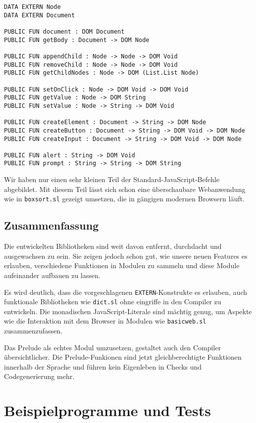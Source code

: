 \documentclass[runningheads]{llncs}
\begin{document}
\begin{verbatim}
DATA EXTERN Node
DATA EXTERN Document

PUBLIC FUN document : DOM Document
PUBLIC FUN getBody : Document -> DOM Node

PUBLIC FUN appendChild : Node -> Node -> DOM Void
PUBLIC FUN removeChild : Node -> Node -> DOM Void
PUBLIC FUN getChildNodes : Node -> DOM (List.List Node)

PUBLIC FUN setOnClick : Node -> DOM Void -> DOM Void
PUBLIC FUN getValue : Node -> DOM String
PUBLIC FUN setValue : Node -> String -> DOM Void

PUBLIC FUN createElement : Document -> String -> DOM Node
PUBLIC FUN createButton : Document -> String -> DOM Void -> DOM Node
PUBLIC FUN createInput : Document -> String -> DOM Void -> DOM Node

PUBLIC FUN alert : String -> DOM Void
PUBLIC FUN prompt : String -> String -> DOM String 
\end{verbatim}

Wir haben nur einen sehr kleinen Teil der Standard-JavaScript-Befehle
abgebildet. Mit diesem Teil lässt sich schon eine überschaubare Webanwendung
wie in \verb|boxsort.sl| gezeigt umsetzen, die in gängigen modernen Browsern
läuft.

\subsection{Zusammenfassung}

Die entwickelten Bibliotheken sind weit davon entfernt, durchdacht und
ausgewachsen zu sein. Sie zeigen jedoch schon gut, wie unsere neuen Features
es erlauben, verschiedene Funktionen in Modulen zu sammeln und diese Module
aufeinander aufbauen zu lassen.

Es wird deutlich, dass die vorgeschlagenen \verb|EXTERN|-Konstrukte es
erlauben, auch funktionale Bibliotheken wie \verb|dict.sl| ohne eingriffe
in den Compiler zu entwickeln. Die monadischen JavaScript-Literale sind
mächtig genug, um Aspekte wie die Interaktion mit dem Browser in Modulen
wie \verb|basicweb.sl| zusammenzufassen.

Das Prelude als echtes Modul umzusetzen, gestaltet auch den Compiler
übersichtlicher. Die Prelude-Funkionen sind jetzt gleichberechtigte
Funktionen innerhalb der Sprache und führen kein Eigenleben in Checks und
Codegenerierung mehr.

\section{Beispielprogramme und Tests}
\label{sec:samples}
\end{document}
